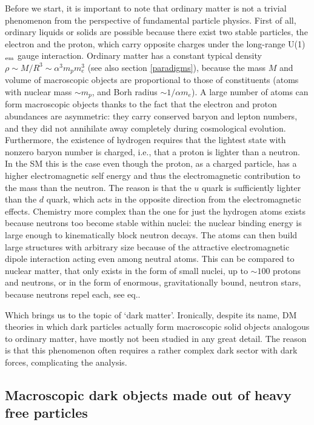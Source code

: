 Before we start, it is important to note that ordinary matter is not a trivial phenomenon
from the perspective of fundamental particle physics.
First of all, ordinary liquids or solids are possible 
because there exist two  stable particles, the electron and the proton, which carry opposite charges
under the long-range U(1)$_{\rm em}$ gauge interaction. Ordinary matter has a constant typical density $\rho \sim M/R^3\sim \alpha^3 m_p m_e^3$ \cite{Weisskopf1975} (see also section \ref{paradigms}), 
because the mass $M$ and volume of macroscopic objects are proportional to those of constituents
(atoms with nuclear mass $\sim m_p$, and Borh radius $\sim 1/\alpha m_e$).
A large number of atoms can form macroscopic objects thanks to the fact that the electron and proton abundances are asymmetric: 
they carry conserved baryon and lepton numbers, and they did not annihilate away completely during cosmological evolution. 
Furthermore, the existence of hydrogen requires that the lightest state with nonzero baryon number 
is charged, i.e., that a proton is lighter than a neutron. 
In the SM this is the case  even though the proton, as a charged particle, has a higher electromagnetic self energy and thus the electromagnetic contribution to the mass than the neutron. The reason is that  the $u$ quark is sufficiently lighter than the $d$ quark, which acts in the opposite direction from the electromagnetic effects. 
Chemistry more complex than the one for just the hydrogen atoms 
exists because neutrons too become stable within nuclei: 
the nuclear binding energy is large enough to kinematically block neutron decays.
The atoms can then build large structures with arbitrary size
because of the attractive electromagnetic dipole interaction acting even among neutral atoms. 
This can be compared to nuclear matter, that
only exists in the form of small nuclei, up to $\sim 100$ protons and neutrons, or in the form of enormous, gravitationally bound,
neutron stars, because neutrons repel each, see eq..


\smallskip

Which brings us to the topic of `dark matter'. Ironically, despite its name,
DM theories in which dark particles actually form macroscopic solid objects analogous to ordinary matter, 
have mostly not been studied in any great detail. The reason is that this phenomenon often requires a rather complex dark sector with dark forces, complicating the analysis.

\subsection{Macroscopic dark objects made  out of heavy free particles}\label{sec:Q1}

